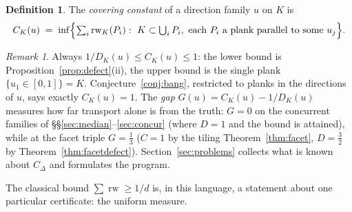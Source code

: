 \documentclass[11pt,reqno]{amsart}
\theoremstyle{plain}
\theoremstyle{definition}
\newtheorem{definition}[theorem]{Definition}
\theoremstyle{remark}
\newtheorem{remark}[theorem]{Remark}
\newcommand{\rw}{\operatorname{rw}}
\begin{document}
\begin{definition}\label{def:covconst}
The \emph{covering constant} of a direction family $u$ on $K$ is
\[
C_K(u)\;=\;\inf\Bigl\{\textstyle\sum_i\rw_K(P_i):\ K\subset\bigcup_iP_i,\
\text{each }P_i\text{ a plank parallel to some }u_j\Bigr\}.
\]
\end{definition}

\begin{remark}\label{rem:covconst}
Always $1/D_K(u)\le C_K(u)\le1$: the lower bound is
Proposition~\ref{prop:defect}(ii), the upper bound is the single plank
$\{u_1\in[0,1]\}=K$. Conjecture~\ref{conj:bang}, restricted to planks in the
directions of $u$, says exactly $C_K(u)=1$. The \emph{gap}
$G(u)=C_K(u)-1/D_K(u)$ measures how far transport alone is from the truth:
$G=0$ on the concurrent families of \S\S\ref{sec:median}--\ref{sec:concur}
(where $D=1$ and the bound is attained), while at the facet triple $G=\tfrac13$
($C=1$ by the tiling Theorem~\ref{thm:facet}, $D=\tfrac32$ by
Theorem~\ref{thm:facetdefect}). Section~\ref{sec:problems} collects what is
known about $C_\Delta$ and formulates the program.
\end{remark}

The classical bound $\sum\rw\ge1/d$ is, in this language, a statement about
one particular certificate: the uniform measure.
\end{document}
